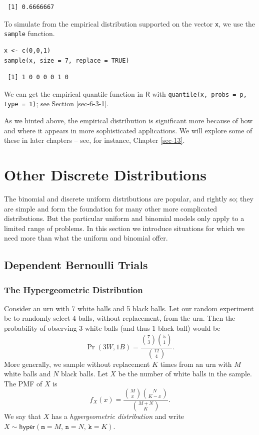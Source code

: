 \documentclass[captions=tableheading]{scrbook}
\begin{document}
\begin{verbatim}
 [1] 0.6666667
\end{verbatim}

To simulate from the empirical distribution supported on the vector \texttt{x}, we use the \texttt{sample} function.


\begin{verbatim}
x <- c(0,0,1)
sample(x, size = 7, replace = TRUE)
\end{verbatim}

\begin{verbatim}
 [1] 1 0 0 0 0 1 0
\end{verbatim}

We can get the empirical quantile function in \(\mathsf{R}\) with \texttt{quantile(x, probs = p, type = 1)}; see Section \ref{sec-6-3-1}.

As we hinted above, the empirical distribution is significant more because of how and where it appears in more sophisticated applications. We will explore some of these in later chapters -- see, for instance, Chapter \ref{sec-13}.
\section{Other Discrete Distributions}
\label{sec-5-6}
\label{sec-other-discrete-distributions}


The binomial and discrete uniform distributions are popular, and rightly so; they are simple and form the foundation for many other more complicated distributions. But the particular uniform and binomial models only apply to a limited range of problems. In this section we introduce situations for which we need more than what the uniform and binomial offer.
\subsection{Dependent Bernoulli Trials}
\label{sec-5-6-1}
\label{sec-non-bernoulli-trials}
\subsubsection{The Hypergeometric Distribution}
\label{sec-5-6-1-1}
\label{sub-hypergeometric-dist}


Consider an urn with 7 white balls and 5 black balls. Let our random experiment be to randomly select 4 balls, without replacement, from the urn. Then the probability of observing 3 white balls (and thus 1 black ball) would be
\begin{equation}
\Pr(3W,1B)=\frac{{7 \choose 3}{5 \choose 1}}{{12 \choose 4}}.
\end{equation}
More generally, we sample without replacement \(K\) times from an urn with \(M\) white balls and \(N\) black balls. Let \(X\) be the number of white balls in the sample. The PMF of \(X\) is
\begin{equation}
f_{X}(x)=\frac{{M \choose x}{N \choose K-x}}{{M+N \choose K}}.
\end{equation}
We say that \(X\) has a \emph{hypergeometric distribution} and write \(X\sim\mathsf{hyper}(\mathtt{m}=M,\,\mathtt{n}=N,\,\mathtt{k}=K)\).
\end{document}

